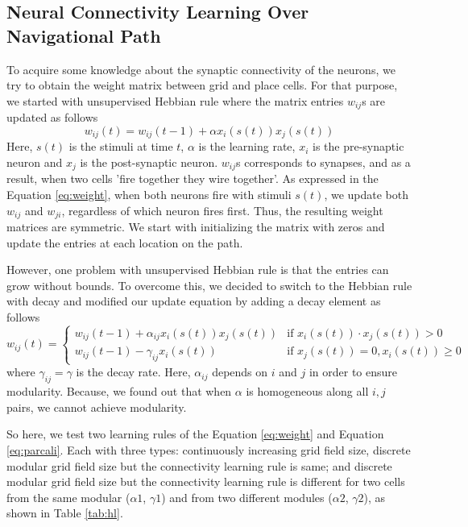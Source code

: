 \documentclass[11pt, letterpaper, onecolumn]{article}
\begin{document}
\subsection{Neural Connectivity Learning Over Navigational Path}

To acquire some knowledge about the synaptic connectivity of the neurons, we try to obtain the weight matrix between grid and place cells. For that purpose, we started with unsupervised Hebbian rule where the matrix entries $ w_{ij} $s are updated as follows
\begin{equation}
\label{eq:weight}
w_{ij}(t) = w_{ij}(t-1) + \alpha x_{i}(s(t)) x_{j}(s(t))
\end{equation}
Here, $ s(t) $ is the stimuli at time $ t $, $ \alpha $ is the learning rate, $ x_{i} $ is the pre-synaptic neuron and $ x_{j} $ is the post-synaptic neuron. $ w_{ij} $s corresponds to synapses, and as a result, when two cells 'fire together they wire together'. As expressed in the Equation \ref{eq:weight}, when both neurons fire with stimuli $ s(t) $, we update both $ w_{ij} $ and $ w_{ji} $, regardless of which neuron fires first. Thus, the resulting weight matrices are symmetric. We start with initializing the matrix with zeros and update the entries at each location on the path.

However, one problem with unsupervised Hebbian rule is that the entries can grow without bounds. To overcome this, we decided to switch to the Hebbian rule with decay and modified our update equation by adding a decay element as follows
\begin{equation}
\label{eq:parcali}
w_{ij}(t) = \begin{cases} 
     		 w_{ij}(t-1) + \alpha_{ij} x_{i}(s(t)) x_{j}(s(t)) & \mbox{if  } x_{i}(s(t)) \cdot x_{j}(s(t))>0 \\
     		 w_{ij}(t-1) - \gamma_{ij} x_{i}(s(t)) & \mbox{if  } x_{j}(s(t))=0, x_{i}(s(t)) \geq 0
  		 	\end{cases}
\end{equation}
where $ \gamma_{ij} = \gamma $ is the decay rate. Here, $ \alpha_{ij} $ depends on $ i $ and $ j $ in order to ensure modularity. Because, we found out that when $ \alpha $ is homogeneous along all $ i,j $ pairs, we cannot achieve modularity.

So here, we test two learning rules of the Equation \ref{eq:weight} and Equation \ref{eq:parcali}. Each with three types: continuously increasing grid field size, discrete modular grid field size but the connectivity learning rule is same; and discrete modular grid field size but the connectivity learning rule is different for two cells from the same modular ($\alpha1$, $\gamma1$) and from two different modules ($\alpha2$, $\gamma2$), as shown in Table \ref{tab:hl}. 
\end{document}

